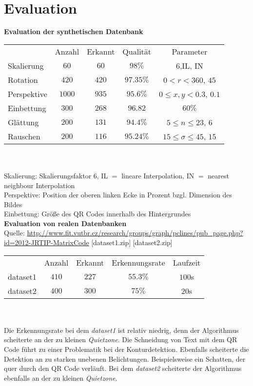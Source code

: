 \section{Evaluation}

\textbf{Evaluation der synthetischen Datenbank} \\
\begin{tabular}{l c c c c}
 		& Anzahl & Erkannt & Qualität & Parameter \\
		Skalierung & $60$ & $60$ & $98\%$ & $6$,IL, IN \\
		Rotation  & $420$ & $420$ & $97.35\%$ & $0<r<360$, $45$\\
		Perspektive & $1000$ & $935$ & $95.6\%$ & $0 \leq x,y<0.3$, $0.1$\\
		Einbettung & $300$ & $268$ &  $96.82$ & $60\%$\\
		Glättung & $200$ & $131$ & $94.4\%$ &  $5\leq n \leq 23$, $6$\\
		Rauschen & $200$ & $116$ & $95.24\%$ & $15 \leq \sigma \leq 45$, $15$\\
\end{tabular}
\\ \\
Skalierung: Skalierungsfaktor $6$, IL $=$ lineare Interpolation, IN $=$ nearest neighbour Interpolation\\
Perspektive: Position der oberen linken Ecke in Prozent bzgl. Dimension des Bildes \\
Einbettung: Größe des QR Codes innerhalb des Hintergrundes \\

\textbf{Evaluation von realen Datenbanken} \\
Quelle: \url{http://www.fit.vutbr.cz/research/groups/graph/pclines/pub_page.php?id=2012-JRTIP-MatrixCode} [dataset1.zip] [dataset2.zip] \\

\begin{tabular}{l c c c c}
 		& Anzahl & Erkannt & Erkennungsrate & Laufzeit \\
		dataset1 & $410$ & $227$ & $55.3\%$ & $100$s \\
		dataset2 & $400$ & $300$ & $75\%$ & $20$s \\
\end{tabular}
\\ \\
Die Erkennungsrate bei dem \emph{dataset1} ist relativ niedrig, denn der Algorithmus scheiterte an der zu kleinen  \emph{Quietzone}.
Die Schneidung von Text mit dem QR Code führt zu einer Problematik bei der Konturdetektion. Ebenfalls scheiterte die Detektion an zu starken unebenen Belichtungen. Beispielsweise ein Schatten, der quer durch den QR Code verläuft.
Bei dem \emph{dataset2} scheiterte der Algorithmus ebenfalls an der zu kleinen \emph{Quietzone}. \\ \\


